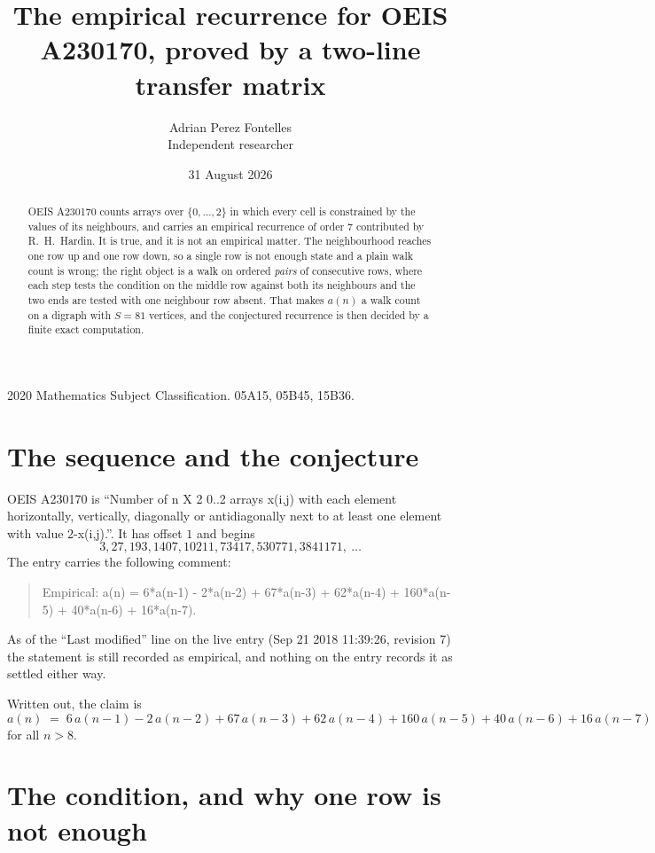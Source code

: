 \documentclass[11pt,a4paper]{article}
\title{The empirical recurrence for OEIS A230170, proved by a two-line transfer matrix}
\author{Adrian Perez Fontelles\\ \small Independent researcher}
\date{31 August 2026}
\theoremstyle{plain}
\theoremstyle{definition}
\begin{document}
\maketitle

\begin{abstract}
OEIS A230170 counts arrays over $\{0,\dots,2\}$ in which every cell is constrained by the
values of its neighbours, and carries an empirical recurrence of order $7$ contributed
by R.~H.~Hardin. It is true, and it is not an empirical matter. The neighbourhood reaches one
row up and one row down, so a single row is not enough state and a plain walk count
is wrong; the right object is a walk on ordered \emph{pairs} of consecutive rows, where
each step tests the condition on the middle row against both its neighbours and the two
ends are tested with one neighbour row absent. That makes $a(n)$ a walk count on a digraph
with $S=81$ vertices, and the conjectured recurrence is then decided by a finite exact
computation.
\end{abstract}

\noindent\small 2020 Mathematics Subject Classification. 05A15, 05B45, 15B36.\normalsize

\section{The sequence and the conjecture}

OEIS A230170 is ``Number of n X 2 0..2 arrays x(i,j) with each element horizontally, vertically, diagonally or antidiagonally next to at least one element with value 2-x(i,j).''. It has offset $1$ and begins
\[
3, 27, 193, 1407, 10211, 73417, 530771, 3841171,\ \dots
\]
The entry carries the following comment:
\begin{quote}\small
Empirical: a(n) = 6*a(n-1) - 2*a(n-2) + 67*a(n-3) + 62*a(n-4) + 160*a(n-5) + 40*a(n-6) + 16*a(n-7).
\end{quote}
As of the ``Last modified'' line on the live entry (Sep 21 2018 11:39:26, revision 7) the statement is
still recorded as empirical, and nothing on the entry records it as settled either way.

Written out, the claim is
\begin{equation}\label{eq:conj}
a(n)\;=\;6\,a(n-1) - 2\,a(n-2) + 67\,a(n-3) + 62\,a(n-4) + 160\,a(n-5) + 40\,a(n-6) + 16\,a(n-7)
\end{equation}
for all $n>8$.

\section{The condition, and why one row is not enough}
\end{document}

